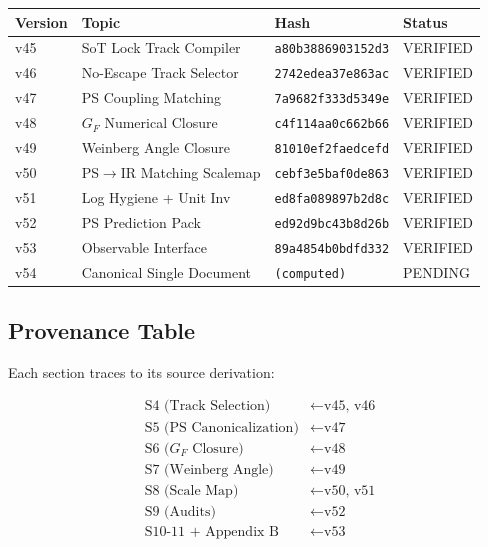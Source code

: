 \documentclass[11pt,a4paper]{article}
\begin{document}
\begin{hashbox}
\label{box:hash-chain}
\begin{center}
\begin{tabular}{llll}
\toprule
\textbf{Version} & \textbf{Topic} & \textbf{Hash} & \textbf{Status} \\
\midrule
v45 & SoT Lock Track Compiler & \texttt{a80b3886903152d3} & VERIFIED \\
v46 & No-Escape Track Selector & \texttt{2742edea37e863ac} & VERIFIED \\
v47 & PS Coupling Matching & \texttt{7a9682f333d5349e} & VERIFIED \\
v48 & $G_F$ Numerical Closure & \texttt{c4f114aa0c662b66} & VERIFIED \\
v49 & Weinberg Angle Closure & \texttt{81010ef2faedcefd} & VERIFIED \\
v50 & PS$\to$IR Matching Scalemap & \texttt{cebf3e5baf0de863} & VERIFIED \\
v51 & Log Hygiene + Unit Inv & \texttt{ed8fa089897b2d8c} & VERIFIED \\
v52 & PS Prediction Pack & \texttt{ed92d9bc43b8d26b} & VERIFIED \\
v53 & Observable Interface & \texttt{89a4854b0bdfd332} & VERIFIED \\
v54 & Canonical Single Document & \texttt{(computed)} & PENDING \\
\bottomrule
\end{tabular}
\end{center}
\end{hashbox}

\subsection{Provenance Table}
\label{subsec:provenance}

Each section traces to its source derivation:

\begin{equation}
\label{eq:provenance-map}
\begin{aligned}
\text{S4 (Track Selection)} &\leftarrow \text{v45, v46} \\
\text{S5 (PS Canonicalization)} &\leftarrow \text{v47} \\
\text{S6 ($G_F$ Closure)} &\leftarrow \text{v48} \\
\text{S7 (Weinberg Angle)} &\leftarrow \text{v49} \\
\text{S8 (Scale Map)} &\leftarrow \text{v50, v51} \\
\text{S9 (Audits)} &\leftarrow \text{v52} \\
\text{S10-11 + Appendix B} &\leftarrow \text{v53}
\end{aligned}
\end{equation}
\end{document}

